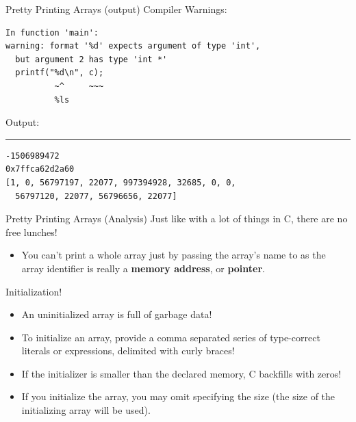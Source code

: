 \documentclass[11pt]{beamer}
\let\OldTexttt\texttt
\renewcommand{\texttt}[1]{\OldTexttt{\color{teal}{#1}}}
\begin{document}
\begin{frame}[fragile=singleslide]{Pretty Printing Arrays (output)}
Compiler Warnings:
\begin{lstlisting}[style=terminal]
In function 'main':
warning: format '%d' expects argument of type 'int', 
  but argument 2 has type 'int *'
  printf("%d\n", c);
          ~^     ~~~
          %ls
\end{lstlisting}
Output:
\hrule
\begin{lstlisting}[style=terminal]
-1506989472
0x7ffca62d2a60
[1, 0, 56797197, 22077, 997394928, 32685, 0, 0, 
  56797120, 22077, 56796656, 22077]
\end{lstlisting}
\end{frame}

\begin{frame}{Pretty Printing Arrays (Analysis)}
Just like with a lot of things in C, there are no free lunches! 
\begin{itemize}
\item You can't print a whole array just by passing the array's name to \texttt{printf} as the array identifier is really a \textbf{memory address}, or \textbf{pointer}.
\end{itemize}
Initialization!
\begin{itemize}
\item An uninitialized array is full of garbage data! 
\item To initialize an array, provide a comma separated series of type-correct literals or expressions, delimited with curly braces! 
\item If the initializer is smaller than the declared memory, C backfills with zeros!
\item If you initialize the array, you may omit specifying the size (the size of the initializing array will be used).
\end{itemize}
\end{frame}
\end{document}
